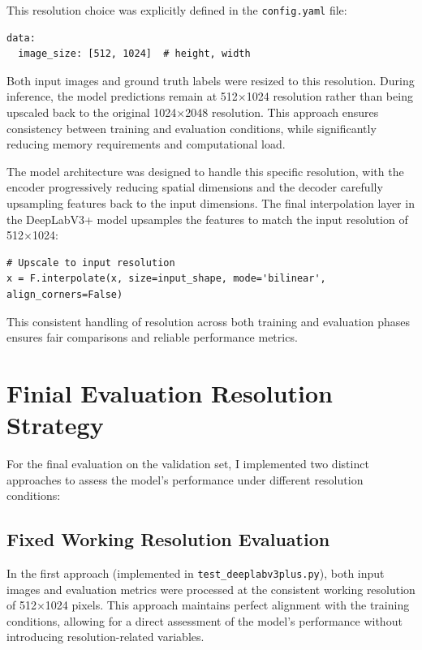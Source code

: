 \documentclass[]{article}
\begin{document}
This resolution choice was explicitly defined in the \texttt{config.yaml} file:
\begin{verbatim}
data:
  image_size: [512, 1024]  # height, width
\end{verbatim}

Both input images and ground truth labels were resized to this resolution. During inference, the model predictions remain at 512×1024 resolution rather than being upscaled back to the original 1024×2048 resolution. This approach ensures consistency between training and evaluation conditions, while significantly reducing memory requirements and computational load.

The model architecture was designed to handle this specific resolution, with the encoder progressively reducing spatial dimensions and the decoder carefully upsampling features back to the input dimensions. The final interpolation layer in the DeepLabV3+ model upsamples the features to match the input resolution of 512×1024:

\begin{verbatim}
# Upscale to input resolution
x = F.interpolate(x, size=input_shape, mode='bilinear', align_corners=False)
\end{verbatim}

This consistent handling of resolution across both training and evaluation phases ensures fair comparisons and reliable performance metrics.

\section{Finial Evaluation Resolution Strategy}\label{sec:Evaluation}
For the final evaluation on the validation set, I implemented two distinct approaches to assess the model's performance under different resolution conditions:

\subsection{Fixed Working Resolution Evaluation}
In the first approach (implemented in \texttt{test\_deeplabv3plus.py}), both input images and evaluation metrics were processed at the consistent working resolution of 512×1024 pixels. This approach maintains perfect alignment with the training conditions, allowing for a direct assessment of the model's performance without introducing resolution-related variables.
\end{document}
